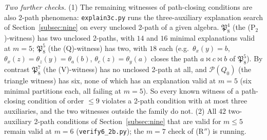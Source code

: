 \documentclass[11pt]{amsart}
\theoremstyle{definition}
\renewcommand{\P}{\mathcal{P}}
\newcommand{\mt}{\bowtie}   %
\begin{document}
\smallskip
\emph{Two further checks.} (1) The remaining witnesses of path-closing conditions are also 2-path phenomena: \texttt{explain3c.py} runs the three-auxiliary explanation search of Section~\ref{subsec:nine} on every unclosed 2-path of a given algebra. $\mathfrak P_8^4$ (the (P$_2$)-witness) has two unclosed 2-paths, with $14$ and $16$ minimal explanations valid at $m=5$; $\mathfrak P_8^5$ (the (Q)-witness) has two, with $18$ each (e.g.\ $\theta_x(y)=b$, $\theta_x(z)=\theta_z(y)=\theta_a(b)$, $\theta_c(z)=\theta_y(a)$ closes the path $a\mt c\mt b$ of $\mathfrak P_8^5$). By contrast $\mathfrak P_8^7$ (the (V)-witness) has no unclosed 2-path at all, and $\P(Q_0)$ (the triangle witness) has six, none of which has an explanation valid at $m=5$ (six minimal partitions each, all failing at $m=5$). So every known witness of a path-closing condition of order $\le9$ violates a 2-path condition with at most three auxiliaries, and the two witnesses outside the family do not. (2) All $42$ two-auxiliary 2-path conditions of Section~\ref{subsec:nine} that are valid for $m\le5$ remain valid at $m=6$ (\texttt{verify6\_2b.py}); the $m=7$ check of (R$''$) is running.
\end{document}
